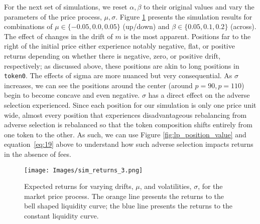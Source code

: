 \documentclass[11pt]{article}
\begin{document}
For the next set of simulations, we reset $\alpha, \beta$ to their original values and vary the parameters of the price process, $\mu, \sigma$. Figure \ref{fig:sim_returns_3} presents the simulation results for combinations of $\mu \in \{ -0.05, 0.0, 0.05 \}$ (up/down) and $\beta \in \{ 0.05, 0.1, 0.2 \}$ (across). The effect of changes in the drift of $m$ is the most apparent. Positions far to the right of the initial price either experience notably negative, flat, or positive returns depending on whether there is negative, zero, or positive drift, respectively; as discussed above, these positions are akin to long positions in \texttt{token0}. The effects of sigma are more nuanced but very consequential. As $\sigma$ increases, we can see the positions around the center (around $p=90, p=110$) begin to become concave and even negative. $\sigma$ has a direct effect on the adverse selection experienced. Since each position for our simulation is only one price unit wide, almost every position that experiences disadvantageous rebalancing from adverse selection is rebalanced so that the token composition shifts entirely from one token to the other. As such, we can use Figure \ref{fig:lp_position_value} and equation~\eqref{eq:19} above to understand how such adverse selection impacts returns in the absence of fees.

\begin{figure}[H]
    \centering
    \texttt{[image: Images/sim\_returns\_3.png]}
    \caption{Expected returns for varying drifts, $\mu$, and volatilities, $\sigma$, for the market price process. The orange line presents the returns to the bell shaped liquidity curve; the blue line presents the returns to the constant liquidity curve.}
    \label{fig:sim_returns_3}
\end{figure}
\end{document}
